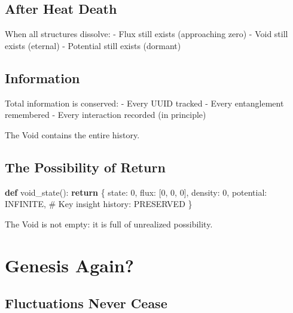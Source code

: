 \documentclass[
  11pt,
  letterpaper,
  twoside,
  openright]{book}
\newenvironment{Shaded}{\begin{snugshade}}{\end{snugshade}}
\newcommand{\CommentTok}[1]{\textcolor[rgb]{0.37,0.37,0.37}{#1}}
\newcommand{\ControlFlowTok}[1]{\textcolor[rgb]{0.00,0.23,0.31}{\textbf{#1}}}
\newcommand{\DecValTok}[1]{\textcolor[rgb]{0.68,0.00,0.00}{#1}}
\newcommand{\KeywordTok}[1]{\textcolor[rgb]{0.00,0.23,0.31}{\textbf{#1}}}
\newcommand{\NormalTok}[1]{\textcolor[rgb]{0.00,0.23,0.31}{#1}}
\newcommand{\StringTok}[1]{\textcolor[rgb]{0.13,0.47,0.30}{#1}}
\begin{document}
\subsection{After Heat Death}\label{after-heat-death}

When all structures dissolve: - Flux still exists (approaching zero) -
Void still exists (eternal) - Potential still exists (dormant)

\subsection{Information}\label{information}

Total information is conserved: - Every UUID tracked - Every
entanglement remembered - Every interaction recorded (in principle)

The Void contains the entire history.

\subsection{The Possibility of Return}\label{the-possibility-of-return}

\begin{Shaded}
\begin{Highlighting}[]
\KeywordTok{def}\NormalTok{ void\_state():}
    \ControlFlowTok{return}\NormalTok{ \{}
        \StringTok{\textquotesingle{}state\textquotesingle{}}\NormalTok{: }\DecValTok{0}\NormalTok{,}
        \StringTok{\textquotesingle{}flux\textquotesingle{}}\NormalTok{: [}\DecValTok{0}\NormalTok{, }\DecValTok{0}\NormalTok{, }\DecValTok{0}\NormalTok{],}
        \StringTok{\textquotesingle{}density\textquotesingle{}}\NormalTok{: }\DecValTok{0}\NormalTok{,}
        \StringTok{\textquotesingle{}potential\textquotesingle{}}\NormalTok{: INFINITE,  }\CommentTok{\# Key insight}
        \StringTok{\textquotesingle{}history\textquotesingle{}}\NormalTok{: PRESERVED}
\NormalTok{    \}}
\end{Highlighting}
\end{Shaded}

The Void is not empty: it is full of unrealized possibility.

\section{Genesis Again?}\label{genesis-again}

\subsection{Fluctuations Never Cease}\label{fluctuations-never-cease}
\end{document}
